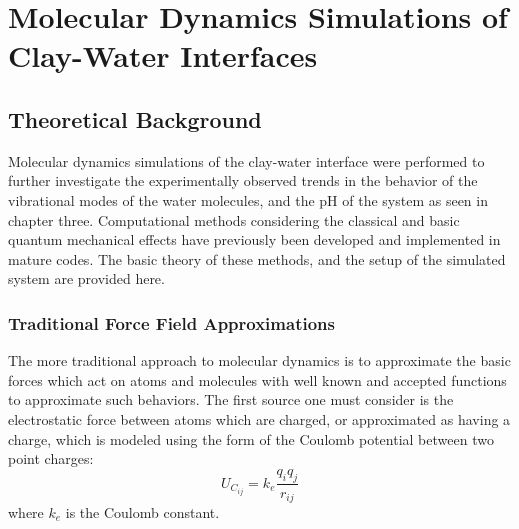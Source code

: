  
\chapter{Molecular Dynamics Simulations of Clay-Water Interfaces}

	\section{Theoretical Background}
		Molecular dynamics simulations of the clay-water interface were performed to further investigate the experimentally observed trends in the behavior of the vibrational modes of the water molecules, and the pH of the system as seen in chapter three. Computational methods considering the classical and basic quantum mechanical effects have previously been developed and implemented in mature codes. The basic theory of these methods, and the setup of the simulated system are provided here. 
	
		
		\subsection{Traditional Force Field Approximations}
			The more traditional approach to molecular dynamics is to approximate the basic forces which act on atoms and molecules with well known and accepted functions to approximate such behaviors. The first source one must consider is the electrostatic force between atoms which are charged, or approximated as having a charge, which is modeled using the form of the Coulomb potential between two point charges:
			\begin{equation}
				U_{C_{ij}} = k_e \frac{q_iq_j}{r_{ij}}
				\label{eq:coulomb}
			\end{equation}
			where $k_e$ is the Coulomb constant. 
			
